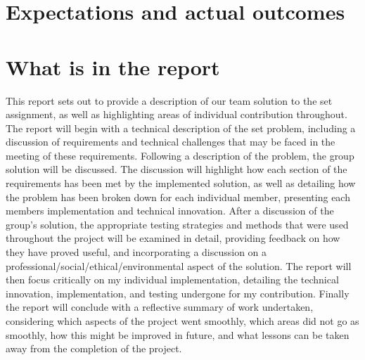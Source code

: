 \section{Expectations and actual outcomes}
\section{What is in the report}
This report sets out to provide a description of our team solution to the set 
assignment, as well as highlighting areas of individual contribution throughout.
The report will begin with a technical description of the set problem, 
including a discussion of requirements and technical challenges that may be 
faced in the meeting of these requirements. 
Following a description of the problem, the group solution will be discussed. 
The discussion will highlight how each section of the requirements has been met 
by the implemented solution, as well as detailing how the problem has been broken 
down for each individual member, presenting each members implementation and 
technical innovation. 
After a discussion of the group's solution, the appropriate testing strategies 
and methods that were used throughout the project will be examined in detail, 
providing feedback on how they have proved useful, and incorporating a 
discussion on a professional/social/ethical/environmental aspect of the solution.
The report will then focus critically on my individual implementation, 
detailing the technical innovation, implementation, and testing undergone for my 
contribution. 
Finally the report will conclude with a reflective summary of work 
undertaken, considering which aspects of the project went smoothly, which areas
did not go as smoothly, how this might be improved in future, and what lessons 
can be taken away from the completion of the project. 
